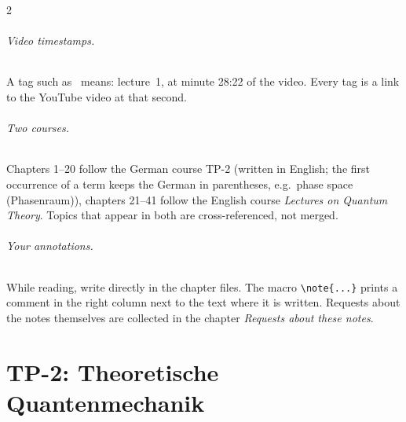 \documentclass[12pt,oneside,openany]{book}
\begin{document}
\begin{paracol}{2}
\paragraph{Video timestamps.} A tag such as \ means: lecture~1, at minute 28:22 of the
video. Every tag is a link to the YouTube video at that second.

\paragraph{Two courses.} Chapters 1--20 follow the German course TP-2 (written in English; the first occurrence of a term keeps the German in parentheses, e.g.\ phase space (Phasenraum)), chapters 21--41 follow the English course \emph{Lectures on Quantum Theory}. Topics that appear in both are cross-referenced, not merged.

\paragraph{Your annotations.} While reading, write directly in the chapter files. The macro
\verb|\note{...}| prints a comment in the right column next to the text where it is written. Requests
about the notes themselves are collected in the chapter \emph{Requests about these notes}.

\flushside
\end{paracol}



\tableofcontents

\mainmatter
\mainmatter
\part{TP-2: Theoretische Quantenmechanik}




















\end{document}

